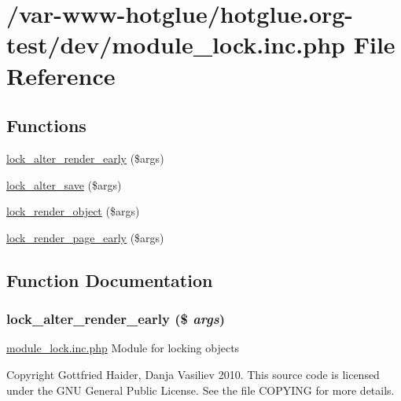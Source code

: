 \hypertarget{module__lock_8inc_8php}{
\section{/var-\/www-\/hotglue/hotglue.org-\/test/dev/module\_\-lock.inc.php File Reference}
\label{module__lock_8inc_8php}
}
\subsection*{Functions}
\begin{DoxyCompactItemize}
\item 
\hyperlink{module__lock_8inc_8php_a1316580c30da4a0735b0ad6ed097c88b}{lock\_\-alter\_\-render\_\-early} (\$args)
\item 
\hyperlink{module__lock_8inc_8php_a020e43e0402fa42f7bf8e6abc37b54d6}{lock\_\-alter\_\-save} (\$args)
\item 
\hyperlink{module__lock_8inc_8php_a3a44bd42a5f48e026bfd3c7464b23d6a}{lock\_\-render\_\-object} (\$args)
\item 
\hyperlink{module__lock_8inc_8php_a4a02b69bbe021a39c825e30035902b29}{lock\_\-render\_\-page\_\-early} (\$args)
\end{DoxyCompactItemize}


\subsection{Function Documentation}
\hypertarget{module__lock_8inc_8php_a1316580c30da4a0735b0ad6ed097c88b}{
\subsubsection[{lock\_\-alter\_\-render\_\-early}]{\setlength{\rightskip}{0pt plus 5cm}lock\_\-alter\_\-render\_\-early (\$ {\em args})}}
\label{module__lock_8inc_8php_a1316580c30da4a0735b0ad6ed097c88b}
\hyperlink{module__lock_8inc_8php}{module\_\-lock.inc.php} Module for locking objects

Copyright Gottfried Haider, Danja Vasiliev 2010. This source code is licensed under the GNU General Public License. See the file COPYING for more details. 

